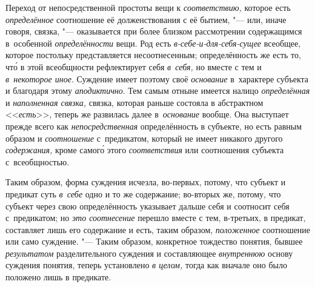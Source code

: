 Переход от непосредственной простоты вещи к {\em соответствию,} которое есть
{\em определённое} соотношение её долженствования с её бытием, "--- или, иначе
говоря, связка, "--- оказывается при более близком рассмотрении содержащимся
в~особенной {\em определённости} вещи. Род есть {\em в-себе-и-для-себя-сущее}
всеобщее, которое постольку представляется несоотнесенным; определённость же
есть то, чт\'{о} в этой всеобщности рефлектирует себя {\em в~себя,} но вместе с тем
и {\em в~некоторое иное}. Суждение имеет поэтому своё {\em основание}
в~характере субъекта и благодаря этому {\em аподиктично}. Тем самым отныне
имеется налицо {\em определённая} и {\em наполненная связка,} связка, которая
раньше состояла в абстрактном <<{\em есть}>>, теперь же развилась далее
в~{\em основание} вообще. Она выступает прежде всего как {\em непосредственная}
определённость в субъекте, но есть равным образом и {\em соотношение}
с~предикатом, который не имеет никакого другого {\em содержания,} кроме
самог\'{о} этого {\em соответствия} или соотношения субъекта с~всеобщностью.

Таким образом, форма суждения исчезла, во-первых, потому, что
субъект и предикат суть {\em в~себе}
одно и то же содержание; во-вторых же, потому, что субъект
через свою определённость указывает дальше себя и соотносит себя
с~предикатом; но {\em это соотнесение} перешло вместе с тем, в-третьих,
в предикат, составляет лишь его содержание и есть, таким образом,
{\em положенное} соотношение или само суждение. "--- Таким образом,
конкретное тождество понятия, бывшее {\em результатом} разделительного суждения
и составляющее {\em внутреннюю} основу суждения понятия, теперь установлено
{\em в целом,} тогда как вначале оно было положено лишь в предикате.

